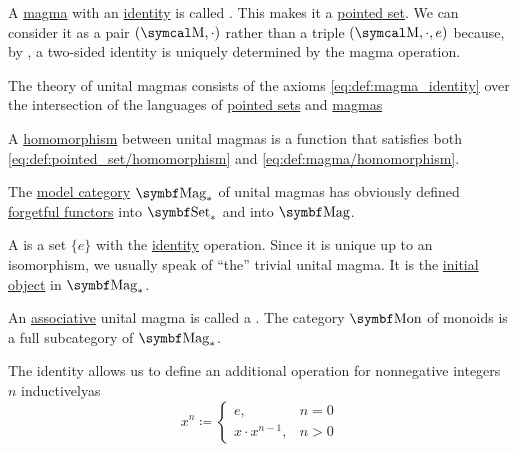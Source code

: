 \begin{definition}\label{def:unital_magma}
  A \hyperref[def:magma]{magma} with an \hyperref[def:magma_identity]{identity} is called . This makes it a \hyperref[def:pointed_set]{pointed set}. We can consider it as a pair \( (\CM, \cdot) \) rather than a triple \( (\CM, \cdot, e) \) because, by , a two-sided identity is uniquely determined by the magma operation.

  \begin{DefEnum}
     The theory of unital magmas consists of the axioms \eqref{eq:def:magma_identity} over the intersection of the languages of \hyperref[def:pointed_set/theory]{pointed sets} and \hyperref[def:magma/theory]{magmas}

     A \hyperref[def:first_order_homomorphism]{homomorphism} between unital magmas is a function that satisfies both \eqref{eq:def:pointed_set/homomorphism} and \eqref{eq:def:magma/homomorphism}.

     The \hyperref[def:first_order_model_category]{model category} \( \Cat{Mag}_* \) of unital magmas has obviously defined \hyperref[def:forgetful_functor]{forgetful functors} into \hyperref[def:pointed_set/category]{\( \Cat{Set}_* \)} and into \hyperref[def:magma/category]{\( \Cat{Mag} \)}.

     A  is a set \( \{ e \} \) with the \hyperref[def:function/diagonal]{identity} operation. Since it is unique up to an isomorphism, we usually speak of \enquote{the} trivial unital magma. It is the \hyperref[def:zero_objects/initial]{initial object} in \( \Cat{Mag}_* \).

     An \hyperref[eq:def:magma/associative]{associative} unital magma is called a . The category \( \Cat{Mon} \) of monoids is a full subcategory of \( \Cat{Mag}_* \).

     The identity allows us to define an additional  operation for nonnegative integers \( n \) inductively\IND as
    \begin{equation*}
      x^n \coloneqq \begin{cases}
        e,               & n = 0 \\
        x \cdot x^{n-1}, & n > 0
      \end{cases}
    \end{equation*}
  \end{DefEnum}
\end{definition}

